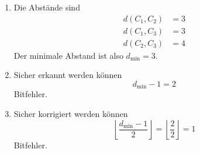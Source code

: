 \begin{questions}

\begin{solution}
\begin{enumerate}
	\item Die Abstände sind
	\begin{align*}
		d(C_1, C_2) &= 3 \\
		d(C_1, C_3) &= 3 \\
		d(C_2, C_3) &= 4
	\end{align*}
	Der minimale Abstand ist also \(d_{\min} = 3\).

	\item Sicher erkannt werden können
	\[
		d_{\min} - 1 = 2
	\]
	Bitfehler.

	\item Sicher korrigiert werden können
	\[
		\left\lfloor \frac{d_{\min} - 1}{2} \right\rfloor = \left\lfloor \frac{2}{2} \right\rfloor = 1
	\]
	Bitfehler.
\end{enumerate}
\end{solution}

\end{questions}